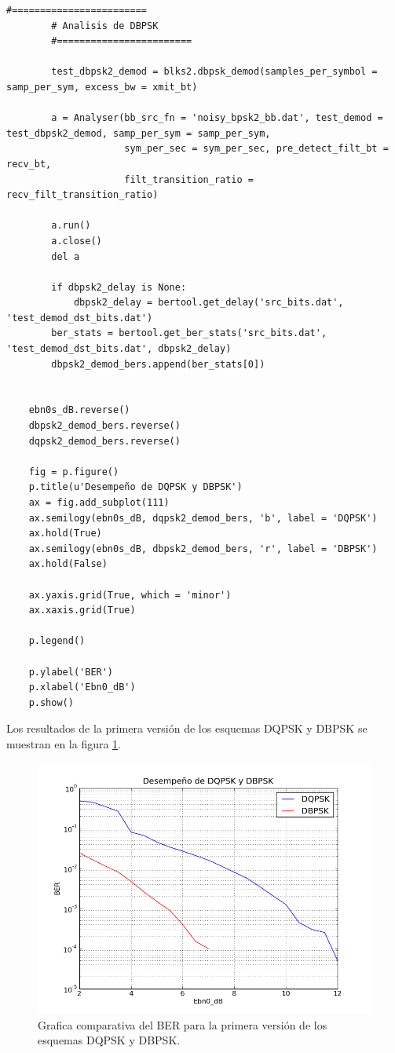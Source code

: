 \begin{lstlisting}[float=hp, label=ex:mainber, caption={C\'odigo Python de la rutina principal del
analisis del BER.}, breaklines=true]
        #========================
        # Analisis de DBPSK
        #========================

        test_dbpsk2_demod = blks2.dbpsk_demod(samples_per_symbol = samp_per_sym, excess_bw = xmit_bt)

        a = Analyser(bb_src_fn = 'noisy_bpsk2_bb.dat', test_demod = test_dbpsk2_demod, samp_per_sym = samp_per_sym,
                     sym_per_sec = sym_per_sec, pre_detect_filt_bt = recv_bt,
                     filt_transition_ratio = recv_filt_transition_ratio)

        a.run()
        a.close()
        del a

        if dbpsk2_delay is None:
            dbpsk2_delay = bertool.get_delay('src_bits.dat', 'test_demod_dst_bits.dat')
        ber_stats = bertool.get_ber_stats('src_bits.dat', 'test_demod_dst_bits.dat', dbpsk2_delay)
        dbpsk2_demod_bers.append(ber_stats[0])


    ebn0s_dB.reverse()
    dbpsk2_demod_bers.reverse()
    dqpsk2_demod_bers.reverse()

    fig = p.figure()
    p.title(u'Desempeño de DQPSK y DBPSK')
    ax = fig.add_subplot(111)
    ax.semilogy(ebn0s_dB, dqpsk2_demod_bers, 'b', label = 'DQPSK')
    ax.hold(True)
    ax.semilogy(ebn0s_dB, dbpsk2_demod_bers, 'r', label = 'DBPSK')
    ax.hold(False)

    ax.yaxis.grid(True, which = 'minor')
    ax.xaxis.grid(True)

    p.legend()

    p.ylabel('BER')
    p.xlabel('Ebn0_dB')
    p.show()
\end{lstlisting}

Los resultados de la primera versi\'on de los esquemas DQPSK y DBPSK se muestran en la figura
\ref{fig:bernormal}.

\begin{figure}[htp]
  \centering
  \includegraphics[scale=0.7]{figs/bernormal}
  \caption{Grafica comparativa del BER para la primera versi\'on de los esquemas DQPSK y DBPSK.}
  \label{fig:bernormal}
\end{figure}

